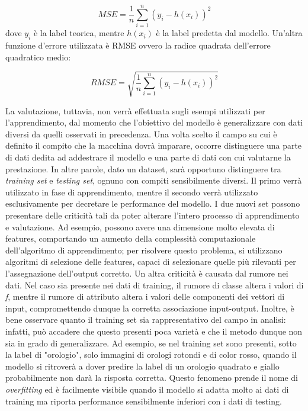 \documentclass[11pt]{article}
\begin{document}
$$MSE = \frac{1}{n}\sum_{i=1}^{n}(y_{i} - h(x_{i}))^{2}$$
dove $y_i$ è la label teorica, mentre $h(x_{i})$ è la label predetta dal modello. 
Un'altra funzione d'errore utilizzata è RMSE ovvero la radice quadrata dell'errore quadratico medio: 

$$RMSE = \sqrt{\frac{1}{n}\sum_{i=1}^{n}(y_{i} - h(x_{i}))^{2}}$$

La valutazione, tuttavia, non verrà effettuata sugli esempi utilizzati per l'apprendimento, dal momento che l'obiettivo del modello è generalizzare con dati diversi da quelli osservati in precedenza. Una volta scelto il campo su cui è definito il compito che la macchina dovrà imparare, occorre distinguere una parte di dati dedita ad addestrare il modello e una parte di dati con cui valutarne la prestazione. In altre parole, dato un dataset, sarà opportuno distinguere tra \textit{training set} e \textit{testing set}, ognuno con compiti sensibilmente diversi. Il primo verrà utilizzato in fase di apprendimento, mentre il secondo verrà utilizzato esclusivamente per decretare le performance del modello. I due nuovi set possono presentare delle criticità tali da poter alterare l'intero processo di apprendimento e valutazione. Ad esempio, possono avere una dimensione molto elevata di features, comportando un aumento della complessità computazionale dell'algoritmo di apprendimento; per risolvere questo problema, si utilizzano algoritmi di selezione delle features, capaci di selezionare quelle più rilevanti per l'assegnazione dell'output corretto. Un altra criticità è causata dal rumore nei dati. Nel caso sia presente nei dati di training, il rumore di classe altera i valori di \textit{f}, mentre il rumore di attributo altera i valori delle componenti dei vettori di input, compromettendo dunque la corretta associazione input-output. Inoltre, è bene osservare quanto il training set sia rappresentativo del campo in analisi: infatti, può accadere che questo presenti poca varietà e che il metodo dunque non sia in grado di generalizzare. Ad esempio, se nel training set sono presenti, sotto la label di "orologio", solo immagini di orologi rotondi e di color rosso, quando il modello si ritroverà a dover predire la label di un orologio quadrato e giallo probabilmente non darà la risposta corretta. Questo fenomeno prende il nome di \textit {overfitting} ed è facilmente visibile quando il modello si adatta molto ai dati di training ma riporta performance sensibilmente inferiori con i dati di testing. 
\end{document}

